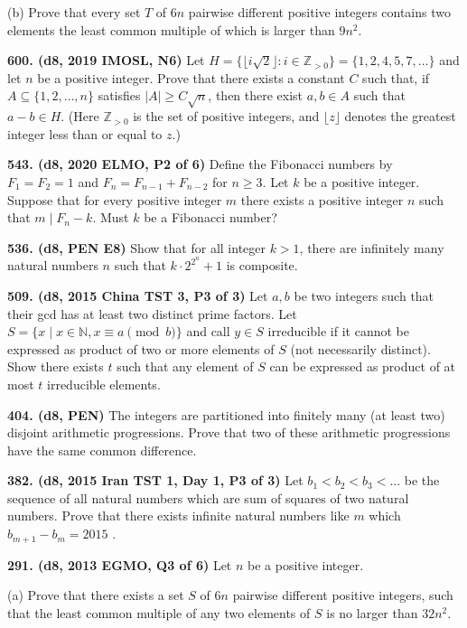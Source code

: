 \documentclass{article}
\begin{document}
(b) Prove that every set $T$ of $6n$ pairwise different positive integers contains two elements the least common multiple of which is larger than $9n^2$.

\textbf{600. (\color{red}d8\color{black}, 2019 IMOSL, N6)} Let $H = \{ \lfloor i\sqrt{2}\rfloor : i \in \mathbb Z_{>0}\} = \{1,2,4,5,7,\dots \}$ and let $n$ be a positive integer. Prove that there exists a constant $C$ such that, if $A\subseteq \{1,2,\dots, n\}$ satisfies $|A| \ge C\sqrt{n}$, then there exist $a,b\in A$ such that $a-b\in H$. (Here $\mathbb Z_{>0}$ is the set of positive integers, and $\lfloor z\rfloor$ denotes the greatest integer less than or equal to $z$.)

\textbf{543. (\color{red}d8\color{black}, 2020 ELMO, P2 of 6)} Define the Fibonacci numbers by $F_1 = F_2 = 1$ and $F_n = F_{n - 1} + F_{n -2}$ for $n \geq 3.$ Let $k$ be a positive integer. Suppose that for every positive integer $m$ there exists a positive integer $n$ such that $m \mid F_n - k.$ Must $k$ be a Fibonacci number?

\textbf{536. (\color{red}d8\color{black}, PEN E8)} Show that for all integer $k>1$, there are infinitely many natural numbers $n$ such that $k \cdot 2^{2^n} + 1$ is composite.

\textbf{509. (\color{red}d8\color{black}, 2015 China TST 3, P3 of 3)} Let $a,b$ be two integers such that their gcd has at least two distinct prime factors. Let $S =  \{ x \mid x \in \mathbb{N}, x \equiv a \pmod b \} $ and call $ y \in S$ irreducible if it cannot be expressed as product of two or more elements of $S$ (not necessarily distinct). Show there exists $t$ such that any element of $S$ can be expressed as product of at most $t$ irreducible elements.

\textbf{404. (\color{red}d8\color{black}, PEN)} The integers are partitioned into finitely many (at least two) disjoint arithmetic progressions. Prove that two of these arithmetic progressions have the same common difference.

\textbf{382. (\color{red}d8\color{black}, 2015 Iran TST 1, Day 1, P3 of 3)} Let $ b_1<b_2<b_3<\dots $ be the sequence of all natural numbers which are sum of squares of two natural numbers.
Prove that there exists infinite natural numbers like $m$ which $b_{m+1}-b_m=2015$ .

\textbf{291. (\color{red}d8\color{black}, 2013 EGMO, Q3 of 6)} Let $n$ be a positive integer.

(a) Prove that there exists a set $S$ of $6n$ pairwise different positive integers, such that the least common multiple of any two elements of $S$ is no larger than $32n^2$.
\end{document}
